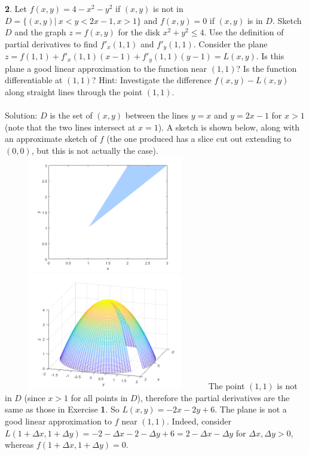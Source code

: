\documentclass[12pt]{amsbook}
\begin{document}
\\
\\
{\small\bf 2}. Let $f(x,y)=4-x^2-y^2$ if $(x, y)$ is not in $D = \{(x, y)| \ x < y < 2x-1 , x >
1\}$ and $f(x, y) = 0$ if $(x, y)$ is in $D$. Sketch $D$ and the graph $z = f(x, y)$ for
the disk $x^2+y^2\leq 4$. Use the definition of partial derivatives to find $f'_x(1,1)$ and $f'_y(1,1)$. Consider the plane $z=f(1,1)+f'_x(1,1)(x-1)+f'_y(1,1)(y-1)=L(x,y)$. Is this plane a good linear approximation to the function near
$(1, 1)$? Is the function differentiable at $(1, 1)$? Hint: Investigate the difference
$f(x, y) - L(x, y)$ along straight lines through the point $(1, 1)$.
\\
\\
{\sc Solution}: $D$ is the set of $(x,y)$ between the lines $y=x$ and $y=2x-1$ for $x>1$ (note that the two lines intersect at $x=1$). A sketch is shown below, along with an approximate sketch of $f$ (the one produced has a slice cut out extending to $(0,0)$, but this is not actually the case). 
\\
\includegraphics[width=3.5in,height=2.0in]{3_21_2_1.png}
\includegraphics[width=3.5in,height=2.0in]{3_21_2_2.png}
The point $(1,1)$ is not in $D$ (since $x>1$ for all points in $D$), therefore the partial derivatives are the same as those in Exercise {\bf 1}. So $L(x,y)=-2x-2y+6$. The plane is not a good linear approximation to $f$ near $(1,1)$. Indeed, consider $L(1+\Delta x,1 +\Delta y)=-2-\Delta x-2-\Delta y+6=2-\Delta x - \Delta y$ for $\Delta x,\Delta y >0$, whereas $f(1+\Delta x,1+\Delta y)=0$. 
\end{document}
